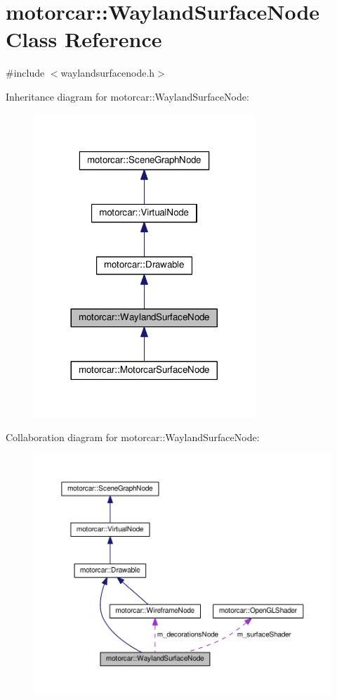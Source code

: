\hypertarget{classmotorcar_1_1WaylandSurfaceNode}{\section{motorcar\-:\-:Wayland\-Surface\-Node Class Reference}
\label{classmotorcar_1_1WaylandSurfaceNode}
}


{\ttfamily \#include $<$waylandsurfacenode.\-h$>$}



Inheritance diagram for motorcar\-:\-:Wayland\-Surface\-Node\-:
\nopagebreak
\begin{figure}[H]
\begin{center}
\leavevmode
\includegraphics[width=236pt]{classmotorcar_1_1WaylandSurfaceNode__inherit__graph}
\end{center}
\end{figure}


Collaboration diagram for motorcar\-:\-:Wayland\-Surface\-Node\-:
\nopagebreak
\begin{figure}[H]
\begin{center}
\leavevmode
\includegraphics[width=350pt]{classmotorcar_1_1WaylandSurfaceNode__coll__graph}
\end{center}
\end{figure}
